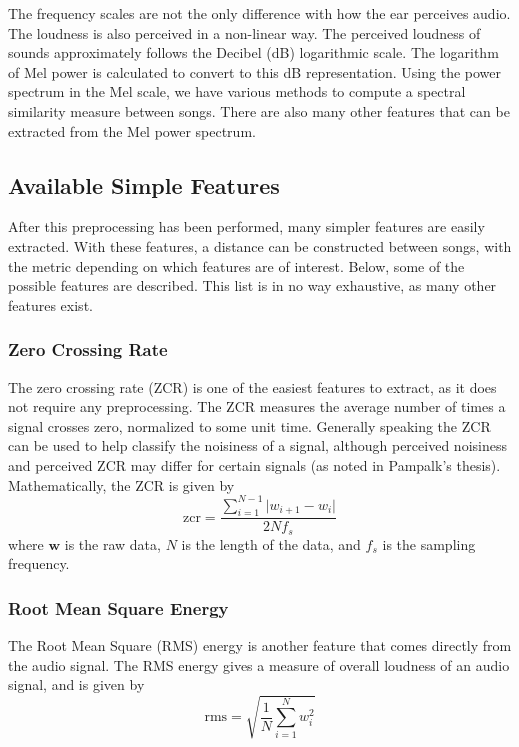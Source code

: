 \documentclass[12pt]{article}
\begin{document}
The frequency scales are not the only difference with how the ear perceives audio.  The loudness is also perceived in a non-linear way.  The perceived loudness of sounds approximately follows the Decibel (dB) logarithmic scale.  The logarithm of Mel power is calculated to convert to this dB representation.  Using the power spectrum in the Mel scale, we have various methods to compute a spectral similarity measure between songs.  There are also many other features that can be extracted from the Mel power spectrum.

\subsection{Available Simple Features}

After this preprocessing has been performed, many simpler features are easily extracted.  With these features, a distance can be constructed between songs, with the metric depending on which features are of interest.  Below, some of the possible features are described.  This list is in no way exhaustive, as many other features exist.

\subsubsection{Zero Crossing Rate}

The zero crossing rate (ZCR) is one of the easiest features to extract, as it does not require any preprocessing.  The ZCR measures the average number of times a signal crosses zero, normalized to some unit time.  Generally speaking the ZCR can be used to help classify the noisiness of a signal, although perceived noisiness and perceived ZCR may differ for certain signals (as noted in Pampalk's thesis).  Mathematically, the ZCR is given by
$$ \text{zcr} = \frac{\sum_{i=1}^{N-1} \vert w_{i+1} - w_{i} \vert}{2 N f_s} $$
where $\mathbf{w}$ is the raw data, $N$ is the length of the data, and $f_s$ is the sampling frequency.

\subsubsection{Root Mean Square Energy}

The Root Mean Square (RMS) energy is another feature that comes directly from the audio signal.  The RMS energy gives a measure of overall loudness of an audio signal, and is given by
$$ \text{rms} = \sqrt{\frac{1}{N}\sum_{i=1}^N w_i^2} $$
\end{document}
